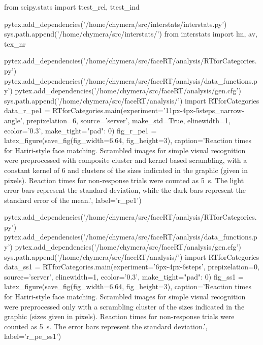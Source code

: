 \begin{pycode}
from scipy.stats import ttest_rel, ttest_ind
\end{pycode}
\begin{pycode}
pytex.add_dependencies('/home/chymera/src/interstats/interstats.py')
sys.path.append('/home/chymera/src/interstats/')
from interstats import lm, av, tex_nr
\end{pycode}

\begin{pycode}
pytex.add_dependencies('/home/chymera/src/faceRT/analysis/RTforCategories.py')
pytex.add_dependencies('/home/chymera/src/faceRT/analysis/data_functions.py')
pytex.add_dependencies('/home/chymera/src/faceRT/analysis/gen.cfg')
sys.path.append('/home/chymera/src/faceRT/analysis/')
import RTforCategories
data_r_pe1 = RTforCategories.main(experiment='11px-4px-5steps_narrow-angle', prepixelation=6, source='server', make_std=True, elinewidth=1, ecolor='0.3', make_tight={"pad": 0})
fig_r_pe1 = latex_figure(save_fig(fig_width=6.64, fig_height=3), caption='Reaction times for Hariri-style face matching. Scrambled images for simple visual recognition were preprocessed with composite cluster and kernel based scrambling, with a constant kernel of \SI{6}{\pixel} and clusters of the sizes indicated in the graphic (given in pixels). Reaction times for non-response trials were counted as \SI{5}{\second}. The light error bars represent the standard deviation, while the dark bars represent the standard error of the mean.', label='r_pe1')
\end{pycode}
\begin{pycode}
pytex.add_dependencies('/home/chymera/src/faceRT/analysis/RTforCategories.py')
pytex.add_dependencies('/home/chymera/src/faceRT/analysis/data_functions.py')
pytex.add_dependencies('/home/chymera/src/faceRT/analysis/gen.cfg')
sys.path.append('/home/chymera/src/faceRT/analysis/')
import RTforCategories
data_ss1 = RTforCategories.main(experiment='6px-4px-6steps', prepixelation=0, source='server', elinewidth=1, ecolor='0.3', make_tight={"pad": 0})
fig_ss1 = latex_figure(save_fig(fig_width=6.64, fig_height=3), caption='Reaction times for Hariri-style face matching. Scrambled images for simple visual recognition were preprocessed only with a scrambling cluster of the sizes indicated in the graphic (sizes given in pixels). Reaction times for non-response trials were counted as \SI{5}{\second}. The error bars represent the standard deviation.', label='r_pe_ss1')
\end{pycode}
